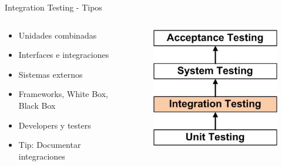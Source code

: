 \documentclass{beamer}
\begin{document}
\begin{frame}{Integration Testing - Tipos}
\begin{columns}[T]
\begin{column}[T]{6cm}
\begin{itemize}
	\item Unidades combinadas
	\item Interfaces e integraciones
	\item Sistemas externos
	\item Frameworks, White Box, Black Box
	\item Developers y testers
	\item Tip: Documentar integraciones
\end{itemize}
\end{column}
\begin{column}[T]{4cm} %
\begin{figure}
	\centering
	\includegraphics[width=0.8\linewidth]{Images/integrationtesting}
\end{figure}

\end{column}
\end{columns}
\end{frame}
\end{document}
